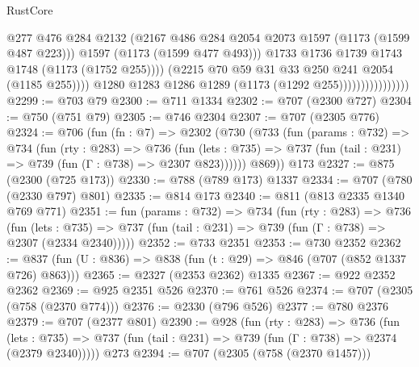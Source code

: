 \begin{lexlean}{RustCore}
\begin{coremodule}
                                          @277
                                          @476
                                          @284
                                          @2132
                                          (@2167
                                            @486
                                            @284
                                            @2054
                                            @2073
                                            @1597
                                            (@1173 (@1599 @487 @223)))
                                          @1597
                                          (@1173 (@1599 @477 @493)))
                                        @1733
                                        @1736
                                        @1739
                                        @1743
                                        @1748
                                        (@1173 (@1752 @255))))
                                    (@2215 @70 @59 @31 @33 @250 @241 @2054 (@1185 @255))))
                                @1280
                                @1283
                                @1286
                                @1289
                                (@1173 (@1292 @255))))))))))))))))
@2299 := @703 @79
@2300 := @711 @1334
@2302 := @707 (@2300 @727)
@2304 := @750 (@751 @79)
@2305 := @746 @2304
@2307 := @707 (@2305 @776)
@2324 := @706
    (fun (fn : @7) =>
    @2302
      (@730
        (@733
          (fun (params : @732) =>
          @734
            (fun (rty : @283) =>
            @736
              (fun (lets : @735) =>
              @737 (fun (tail : @231) => @739 (fun (Γ : @738) => @2307 @823))))))
        @869))
    @173
@2327 := @875 (@2300 (@725 @173))
@2330 := @788 (@789 @173) @1337
@2334 := @707 (@780 (@2330 @797) @801)
@2335 := @814 @173
@2340 := @811 (@813 @2335 @1340 @769 @771)
@2351 := fun (params : @732) =>
  @734
    (fun (rty : @283) =>
    @736
      (fun (lets : @735) =>
      @737 (fun (tail : @231) => @739 (fun (Γ : @738) => @2307 (@2334 @2340)))))
@2352 := @733 @2351
@2353 := @730 @2352
@2362 := @837 (fun (U : @836) => @838 (fun (t : @29) => @846 (@707 (@852 @1337 @726) @863)))
@2365 := @2327 (@2353 @2362) @1335
@2367 := @922 @2352 @2362
@2369 := @925 @2351 @526
@2370 := @761 @526
@2374 := @707 (@2305 (@758 (@2370 @774)))
@2376 := @2330 (@796 @526)
@2377 := @780 @2376
@2379 := @707 (@2377 @801)
@2390 := @928
    (fun (rty : @283) =>
    @736
      (fun (lets : @735) =>
      @737 (fun (tail : @231) => @739 (fun (Γ : @738) => @2374 (@2379 @2340)))))
    @273
@2394 := @707 (@2305 (@758 (@2370 @1457)))

\end{coremodule}
\end{lexlean}
